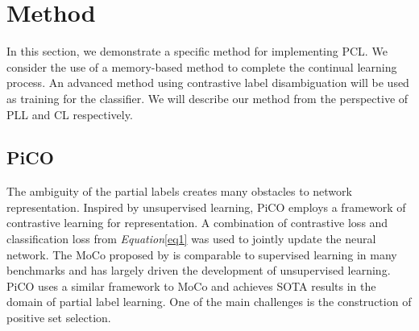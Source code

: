 \documentclass{article} %
\begin{document}
\section{Method}
In this section, we demonstrate a specific method for implementing PCL. We consider the use of a memory-based method to complete the continual learning process\citep{MIR}. An advanced method using contrastive label disambiguation will be used as training for the classifier\citep{HaoboWang2022PiCOCL}. We will describe our method from the perspective of PLL and CL respectively. 
\subsection{PiCO}
The ambiguity of the partial labels creates many obstacles to network representation. Inspired by unsupervised learning, PiCO employs a framework of contrastive learning for representation\citep{HaoboWang2022PiCOCL}.
A combination of contrastive loss and classification loss from \textit{Equation}\ref{eq1} was used to jointly update the neural network.
The MoCo proposed by \citet{KaimingHe2019MomentumCF} is comparable to supervised learning in many benchmarks and has largely driven the development of unsupervised learning.
PiCO uses a similar framework to MoCo and achieves SOTA results in the domain of partial label learning. One of the main challenges is the construction of positive set selection.
\end{document}

